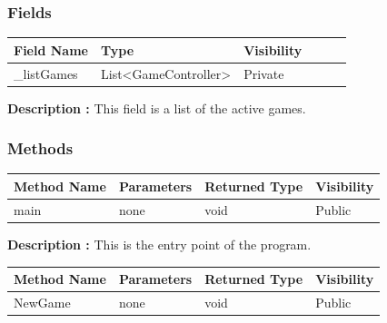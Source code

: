 \documentclass[12pt]{article}
\begin{document}
\subsubsection{Fields}

\begin{table}[H]
    \begin{tabular}{llllll}
    \hline
    \multicolumn{1}{|l|}{\cellcolor[HTML]{EFEFEF}\textbf{Field Name}} & \multicolumn{1}{l|}{\cellcolor[HTML]{EFEFEF}\textbf{Type}} & \multicolumn{1}{l|}{\cellcolor[HTML]{EFEFEF}\textbf{Visibility}} \\ \hline
    \multicolumn{1}{|l|}{\_listGames}                                 & \multicolumn{1}{l|}{List<GameController>}                                & \multicolumn{1}{l|}{Private}                                     \\ \hline
    \end{tabular}
\end{table}

\textbf{Description :} This field is a list of the active games.

\subsubsection{Methods}

\begin{table}[H]
    \begin{tabular}{|l|l|l|l|}
    \hline
    \rowcolor[HTML]{EFEFEF} 
    \cellcolor[HTML]{EFEFEF}\textbf{Method Name} & \textbf{Parameters}    & \textbf{Returned Type} & \textbf{Visibility} \\ \hline
    main                                         & none                   & void                   & Public              \\ \hline
    \end{tabular}
\end{table}

\textbf{Description :} This is the entry point of the program.

\begin{table}[H]
    \begin{tabular}{|l|l|l|l|}
    \hline
    \rowcolor[HTML]{EFEFEF} 
    \cellcolor[HTML]{EFEFEF}\textbf{Method Name} & \textbf{Parameters}    & \textbf{Returned Type} & \textbf{Visibility} \\ \hline
    NewGame                                      & none                   & void                   & Public              \\ \hline
    \end{tabular}
\end{table}
\end{document}
